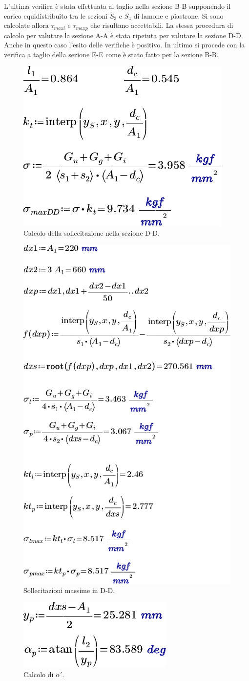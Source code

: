 L'ultima verifica è stata effettuata al taglio nella sezione B-B supponendo il carico equidistribuito tra le sezioni $S_3$ e $S_4$ di lamone e piastrone. Si sono calcolate allora $\tau_{maxl}$ e $\tau_{maxp}$ che risultano accettabili.
La stessa procedura di calcolo per valutare la sezione A-A è stata ripetuta per valutare la sezione D-D. Anche in questo caso l'esito delle verifiche è positivo. 
In ultimo si procede con la verifica a taglio della sezione E-E come è stato fatto per la sezione B-B. 
\begin{figure}[H]
\centering
  \includegraphics[width=.4\textwidth]{imgs/MathTrav3}
\caption{Calcolo della sollecitazione nella sezione D-D.}
\label{fig:MathTrav3}
\end{figure}

\begin{figure}[H]
\centering
  \includegraphics[width=.5\textwidth]{imgs/MathTrav4}
\caption{Sollecitazioni massime in D-D.}
\label{fig:MathTrav4}
\end{figure}

\begin{figure}[H]
\centering
  \includegraphics[width=.3\textwidth]{imgs/MathTrav5}
\caption{Calcolo di $\alpha'$.}
\label{fig:MathTrav5}
\end{figure}

